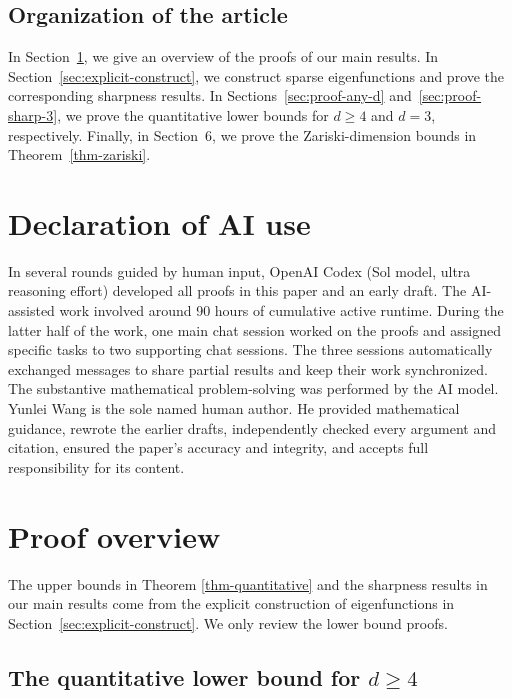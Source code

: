\documentclass[11pt,reqno]{amsart}
\theoremstyle{definition}
\theoremstyle{plain}
\numberwithin{equation}{section}
\begin{document}
\subsection{Organization of the article}

In Section~\ref{sec:overview}, we give an overview of the proofs of our main results.  
In Section~\ref{sec:explicit-construct}, we construct sparse eigenfunctions and prove the corresponding sharpness results.  
In Sections~\ref{sec:proof-any-d} and~\ref{sec:proof-sharp-3}, we prove the quantitative lower bounds for $d\geq4$ and $d=3$, respectively.  
Finally, in Section~6, we prove the Zariski-dimension bounds in Theorem~\ref{thm-zariski}.


\section*{Declaration of AI use}
In several rounds guided by human input, OpenAI Codex (Sol model, ultra reasoning effort) developed all proofs in this paper and an early draft. The AI-assisted work involved around 90 hours of cumulative active runtime. During the latter half of the work, one main chat session worked on the proofs and assigned specific tasks to two supporting chat sessions. The three sessions automatically exchanged messages to share partial results and keep their work synchronized. The substantive mathematical problem-solving was performed by the AI model. Yunlei Wang is the sole named human author. He provided mathematical guidance, rewrote the earlier drafts, independently checked every argument and citation, ensured the paper's accuracy and integrity, and accepts full responsibility for its content.


\section{Proof overview}\label{sec:overview}
The upper bounds in Theorem \ref{thm-quantitative} and the sharpness results in our main results come from the explicit construction of eigenfunctions in Section~\ref{sec:explicit-construct}. We only review the lower bound proofs.
\subsection{The quantitative lower bound for
\texorpdfstring{$d\ge 4$}{}}
\end{document}
